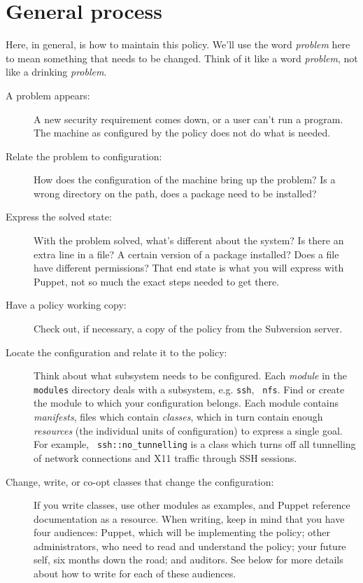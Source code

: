 \section{General process}

Here, in general, is how to maintain this policy. We'll use the word
\emph{problem} here to mean something that needs to be changed. Think of
it like a word \emph{problem}, not like a drinking \emph{problem}.

\begin{description}

\item[A problem appears:]
A new security requirement comes down, or a user can't run a program. The
machine as configured by the policy does not do what is needed.

\item[Relate the problem to configuration:]
How does the configuration of the machine bring up the problem? Is a wrong
directory on the path, does a package need to be installed?

\item[Express the solved state:]
With the problem solved, what's different about the system? Is there an
extra line in a file? A certain version of a package installed? Does a
file have different permissions? That end state is what you will express
with Puppet, not so much the exact steps needed to get there.

\item[Have a policy working copy:]
Check out, if necessary, a copy of the policy from the Subversion server.

\item[Locate the configuration and relate it to the policy:]
Think about what subsystem needs to be configured. Each \emph{module} in
the {\tt modules} directory deals with a subsystem, e.g. {\tt ssh}, {\tt
nfs}. Find or create the module to which your configuration belongs. Each
module contains \emph{manifests}, files which contain \emph{classes},
which in turn contain enough \emph{resources} (the individual units of
configuration) to express a single goal. For example, {\tt
ssh::no\_tunnelling} is a class which turns off all tunnelling of network
connections and X11 traffic through SSH sessions.

\item[Change, write, or co-opt classes that change the configuration:]
If you write classes, use other modules as examples, and Puppet
reference documentation as a resource. When writing, keep in mind that you
have four audiences: Puppet, which will be implementing the policy; other
administrators, who need to read and understand the policy; your future
self, six months down the road; and auditors. See below for more details
about how to write for each of these audiences.


\end{description}
